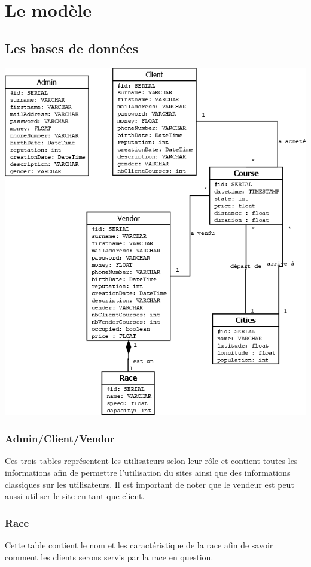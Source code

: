 \documentclass{article}
\begin{document}
\section{Le modèle}
	\subsection{Les bases de données}
		\includegraphics[scale=0.3]{diagrammeTotal.png} \\
		\subsubsection{Admin/Client/Vendor}
			Ces trois tables représentent les utilisateurs selon leur rôle et contient toutes les informations afin de permettre l'utilisation du sites ainsi que des informations classiques sur les utilisateurs. Il est important de noter que le vendeur est peut aussi utiliser le site en tant que client.
		\subsubsection{Race}
			Cette table contient le nom et les caractéristique de la race afin de savoir comment les clients serons servis par la race en question.
\end{document}
